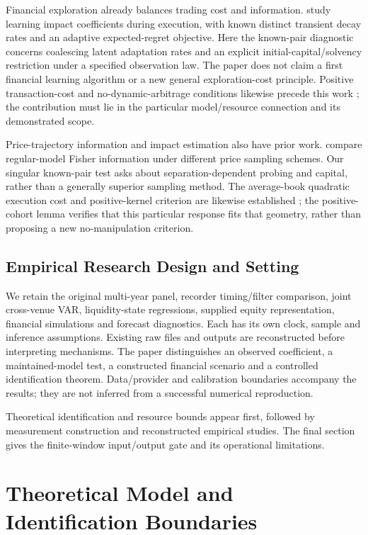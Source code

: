 \documentclass[12pt]{article}
\theoremstyle{definition}
\theoremstyle{remark}
\begin{document}
Financial exploration already balances trading cost and information. \citet{parkvanroy2012} study learning impact coefficients during execution, with known distinct transient decay rates and an adaptive expected-regret objective. Here the known-pair diagnostic concerns coalescing latent adaptation rates and an explicit initial-capital/solvency restriction under a specified observation law. The paper does not claim a first financial learning algorithm or a new general exploration-cost principle. Positive transaction-cost and no-dynamic-arbitrage conditions likewise precede this work \citep{gatheral2010,schneiderlillo2017}; the contribution must lie in the particular model/resource connection and its demonstrated scope.

Price-trajectory information and impact estimation also have prior work. \citet{li2024trajectory} compare regular-model Fisher information under different price sampling schemes. Our singular known-pair test asks about separation-dependent probing and capital, rather than a generally superior sampling method. The average-book quadratic execution cost and positive-kernel criterion are likewise established \citep{alfonsi2016matrix}; the positive-cohort lemma verifies that this particular response fits that geometry, rather than proposing a new no-manipulation criterion.

\subsection{Empirical Research Design and Setting}
We retain the original multi-year panel, recorder timing/filter comparison, joint cross-venue VAR, liquidity-state regressions, supplied equity representation, financial simulations and forecast diagnostics. Each has its own clock, sample and inference assumptions. Existing raw files and outputs are reconstructed before interpreting mechanisms. The paper distinguishes an observed coefficient, a maintained-model test, a constructed financial scenario and a controlled identification theorem. Data/provider and calibration boundaries accompany the results; they are not inferred from a successful numerical reproduction.

Theoretical identification and resource bounds appear first, followed by measurement construction and reconstructed empirical studies. The final section gives the finite-window input/output gate and its operational limitations.


\section{Theoretical Model and Identification Boundaries}
\label{sec:model}
\end{document}
